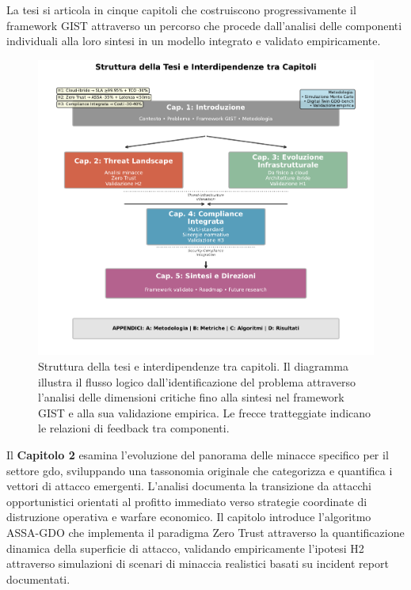 La tesi si articola in cinque capitoli che costruiscono progressivamente il framework GIST attraverso un percorso che procede dall'analisi delle componenti individuali alla loro sintesi in un modello integrato e validato empiricamente.

\begin{figure}[htbp]
\centering
\includegraphics[width=\textwidth]{thesis_figures/cap1/fig_1_4_thesis_structure.pdf}
\caption[Struttura della tesi e flusso logico dell'argomentazione]{Struttura della tesi e interdipendenze tra capitoli. Il diagramma illustra il flusso logico dall'identificazione del problema attraverso l'analisi delle dimensioni critiche fino alla sintesi nel framework GIST e alla sua validazione empirica. Le frecce tratteggiate indicano le relazioni di feedback tra componenti.}
\label{fig:thesis_structure}
\end{figure}

Il \textbf{Capitolo 2} esamina l'evoluzione del panorama delle minacce specifico per il settore \gls{gdo}, sviluppando una tassonomia originale che categorizza e quantifica i vettori di attacco emergenti. L'analisi documenta la transizione da attacchi opportunistici orientati al profitto immediato verso strategie coordinate di distruzione operativa e warfare economico. Il capitolo introduce l'algoritmo ASSA-GDO che implementa il paradigma Zero Trust attraverso la quantificazione dinamica della superficie di attacco, validando empiricamente l'ipotesi H2 attraverso simulazioni di scenari di minaccia realistici basati su incident report documentati.

